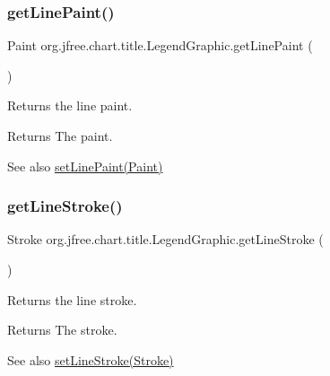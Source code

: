 \subsubsection{\texorpdfstring{get\+Line\+Paint()}{getLinePaint()}}
{\footnotesize\ttfamily Paint org.\+jfree.\+chart.\+title.\+Legend\+Graphic.\+get\+Line\+Paint (\begin{DoxyParamCaption}{ }\end{DoxyParamCaption})}

Returns the line paint.

\begin{DoxyReturn}{Returns}
The paint.
\end{DoxyReturn}
\begin{DoxySeeAlso}{See also}
\mbox{\hyperlink{classorg_1_1jfree_1_1chart_1_1title_1_1_legend_graphic_ad8e6eae25621cbe61af6b006943d6d52}{set\+Line\+Paint(\+Paint)}} 
\end{DoxySeeAlso}
\mbox{\label{classorg_1_1jfree_1_1chart_1_1title_1_1_legend_graphic_af9f4ca73029c94ecb41142b7299bbde0}} 
\subsubsection{\texorpdfstring{get\+Line\+Stroke()}{getLineStroke()}}
{\footnotesize\ttfamily Stroke org.\+jfree.\+chart.\+title.\+Legend\+Graphic.\+get\+Line\+Stroke (\begin{DoxyParamCaption}{ }\end{DoxyParamCaption})}

Returns the line stroke.

\begin{DoxyReturn}{Returns}
The stroke.
\end{DoxyReturn}
\begin{DoxySeeAlso}{See also}
\mbox{\hyperlink{classorg_1_1jfree_1_1chart_1_1title_1_1_legend_graphic_ab9a168a247bab74b0ca95c251d1ea9e7}{set\+Line\+Stroke(\+Stroke)}} 
\end{DoxySeeAlso}
\mbox{\label{classorg_1_1jfree_1_1chart_1_1title_1_1_legend_graphic_a0e3663eec1cd7ca9ab1af059cfd8e59a}} 
